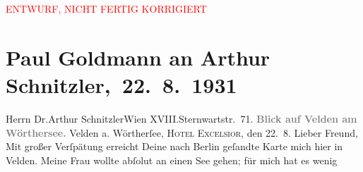 
\begin{center}
            \textcolor{red}{ENTWURF, NICHT FERTIG KORRIGIERT}
                      \end{center}
            
         
         \renewcommand{\erwaehntePersonen}{Personen: Paul Goldmann, Eva Marie Goldmann}
         \renewcommand{\erwaehnteOrte}{Orte: Berlin, Gmunden, Hotel Excelsior, Kärnten, Sternwartestraße 71, Velden am Wörthersee, Wien, XVIII., Währing}
         \renewcommand{\erwaehnteWerke}{}
               \section[ Paul Goldmann an Arthur Schnitzler, 22. 8. 1931]{ Paul Goldmann an Arthur Schnitzler, 22. 8. 1931}\nopagebreak{}\rehead{ }\begin{ledgroupsized}[t]{13cm}\normalsize\beginnumbering \toendnotes[C]{\smallbreak\pagebreak[2]} 
\toendnotes[C]{\smallbreak}\pstart{}{\pb}Herrn Dr.\pend{}\pstart{}Arthur Schnitzler\pend{}\pstart{}Wien XVIII.\pend{}\pstart{}Sternwartstr. 71.\pend{}{\bigskip}\pstart
           \noindent{}\centering{}{\pb}\textcolor{gray}{\textbf{Blick auf Velden am
                        Wörthersee.}}\pend
           \pstart
           Velden a. Wörtherſee, \textsc{Hotel Excelsior}, den 22. 8.\pend
           \pstart
           Lieber Freund, Mit großer Verſpätung erreicht Deine
               nach Berlin geſandte Karte mich hier in Velden. Meine Frau wollte abſolut an einen See gehen; für mich hat es wenig

\end{ledgroupsized}
